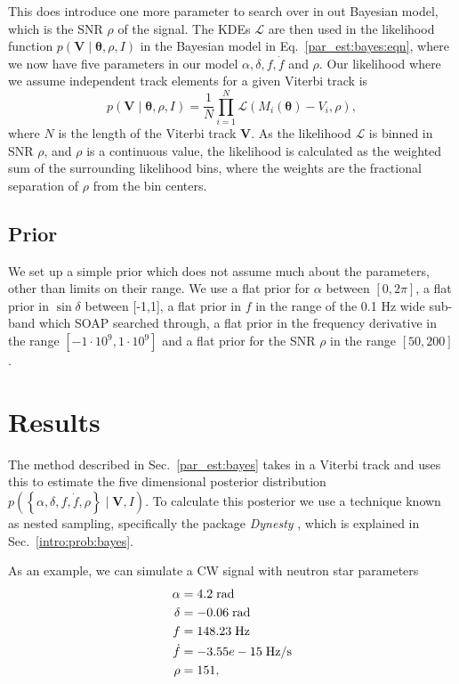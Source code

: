 This does introduce one more parameter to search over in out Bayesian model, which is the \gls{SNR} $\rho$ of the signal.
The \glspl{KDE} $\mathcal{L}$ are then used in the likelihood function $p(\bm{V} \mid \bm{\theta}, \rho, I)$ in the Bayesian model in Eq.~\ref{par_est:bayes:eqn}, where we now have five parameters in our model $\alpha, \delta, f, \dot{f}$ and $\rho$.
Our likelihood where we assume independent track elements for a given Viterbi track is
\begin{equation}
    p(\bm{V} \mid \bm{\theta}, \rho, I) = \frac{1}{N}\prod_{i = 1}^{N} \mathcal{L}(M_i(\bm{\theta}) - V_i, \rho) ,
\end{equation}
where $N$ is the length of the Viterbi track $\bm{V}$. 
\if
As the likelihood $\mathcal{L}$ is binned in \gls{SNR} $\rho$, and $\rho$ is a continuous value, the likelihood is calculated as the weighted sum of the surrounding likelihood bins, where the weights are the fractional separation of $\rho$ from the bin centers. 
\fi

%
\subsection{Prior}
%
We set up a simple prior which does not assume much about the parameters, other than limits on their range. 
We use a flat prior for $\alpha$ between $[0,2\pi]$, a flat prior in $\sin{\delta}$ between [-1,1], a flat prior in $f$ in the range of the 0.1 Hz wide sub-band which SOAP searched through, a flat prior in the frequency derivative in the range $[-1\cdot 10^{9},1\cdot 10^{9}]$ and a flat prior for the \gls{SNR} $\rho$ in the range $[50,200]$.


\clearpage

\section{\label{par_est:results}Results}

The method described in Sec.~\ref{par_est:bayes} takes in a Viterbi track and uses this to estimate the five dimensional posterior distribution $p\left(\left\{ \alpha, \delta, f, \dot{f}, \rho \right\} \mid \bm{V}, I \right)$.
To calculate this posterior we use a technique known as nested sampling, specifically the package {\it Dynesty} \citep{speagle2019DynestyDynamic}, which is explained in Sec.~\ref{intro:prob:bayes}. 

As an example, we can simulate a \gls{CW} signal with neutron star parameters 
\begin{equation}
    \label{par_est:results:examplepars}
    \begin{split}
        \alpha &= 4.2 \; \rm{rad}\\
        \delta &= -0.06 \; \rm{rad} \\
        f &= 148.23 \; \rm{Hz}\\
        \dot{f} &= -3.55e-15 \; \rm{Hz/s}\\
        \rho &= 151,\\
    \end{split}
\end{equation}

